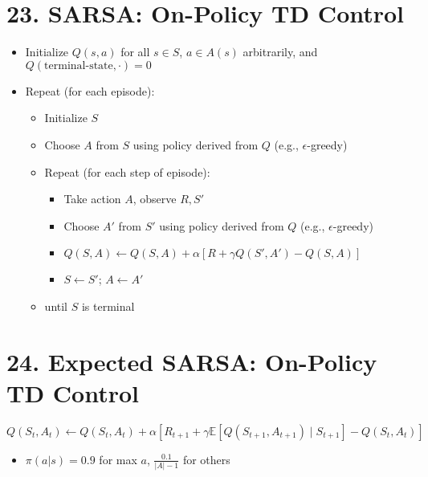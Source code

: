 \documentclass[letterpaper,10pt]{article}
\begin{document}
\begin{multicols}{2}
\section*{23. SARSA: On-Policy TD Control}
\begin{itemize}
    \item Initialize \( Q(s,a) \) for all \( s \in S \), \( a \in A(s) \) arbitrarily, and \( Q(\text{terminal-state}, \cdot) = 0 \)
    \item Repeat (for each episode):
    \begin{itemize}
        \item Initialize \( S \)
        \item Choose \( A \) from \( S \) using policy derived from \( Q \) (e.g., \(\epsilon\)-greedy)
        \item Repeat (for each step of episode):
        \begin{itemize}
            \item Take action \( A \), observe \( R, S' \)
            \item Choose \( A' \) from \( S' \) using policy derived from \( Q \) (e.g., \(\epsilon\)-greedy)
            \item \( Q(S,A) \leftarrow Q(S,A) + \alpha [R + \gamma Q(S', A') - Q(S,A)] \)
            \item \( S \leftarrow S' \); \( A \leftarrow A' \)
        \end{itemize}
        \item until \( S \) is terminal
    \end{itemize}
\end{itemize}

\section*{24. Expected SARSA: On-Policy TD Control}
\[
Q(S_t, A_t) \leftarrow Q(S_t, A_t) + \alpha \left[ R_{t+1} + 
\gamma \mathbb{E}[Q(S_{t+1}, A_{t+1}) \mid S_{t+1}] - Q(S_t, A_t) \right]
\]
\begin{itemize}
    \item \( \pi(a|s) = 0.9\) for max \(a\), \(\frac{0.1}{|A|-1}\) for others
\end{itemize}


\end{multicols}
\end{document}
